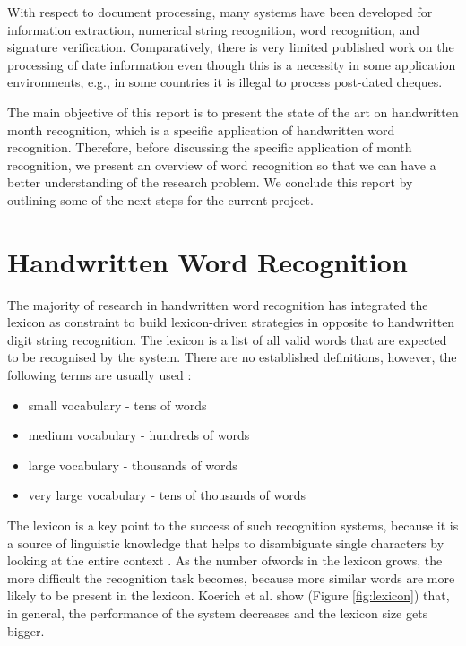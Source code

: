 \documentclass{article}[14pt, oneside, a4paper, times]
\begin{document}
With respect to document processing, many systems have been developed for information extraction, numerical string recognition, word recognition, and signature verification. Comparatively, there is very limited published work on the processing of date information even though this is a necessity in some application environments, e.g., in some countries it is illegal to process post-dated cheques.  

The main objective of this report is to present the state of the art on handwritten month recognition, which is a specific application of handwritten word recognition. Therefore, before discussing the specific application of month recognition, we present an overview of word recognition so that we can have a better understanding of the research problem. We conclude this report by outlining some of the next steps for the current project.


\section{Handwritten Word Recognition}

The majority of research in handwritten word recognition has integrated the lexicon as constraint to build lexicon-driven strategies in opposite to handwritten digit string recognition. The lexicon is a list of all valid words that are expected to be recognised by the system. There are no established definitions, however, the following terms are usually used \cite{Koerich2003}:


\begin{itemize}
\item small vocabulary - tens of words
\item medium vocabulary - hundreds of words
\item large vocabulary - thousands of words
\item very large vocabulary - tens of thousands of words
\end{itemize}


The lexicon is a key point to the success of such recognition systems, because it is a source of linguistic knowledge that helps to disambiguate single characters by looking at the entire context \cite{Kimura93}. As the number ofwords in the lexicon grows, the more difficult the recognition task becomes, because more similar words are more likely to be present in the lexicon. Koerich et al. \cite{Koerich2005} show (Figure \ref{fig:lexicon}) that, in general, the performance of the system decreases and the lexicon size gets bigger.
\end{document}
